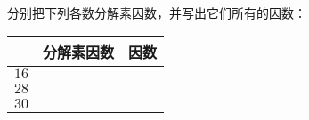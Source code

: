 
分别把下列各数分解素因数，并写出它们所有的因数：\\
\begin{tabular}{|l|l|l|}
	\hline
	  & \hspace{4em}分解素因数\hspace{4em} & \hspace{4em}因数\hspace{4em} \\ \hline
	$16$ &  &  \\ \hline
	$28$ &  &  \\ \hline
	$30$ &  &  \\ \hline
\end{tabular}
